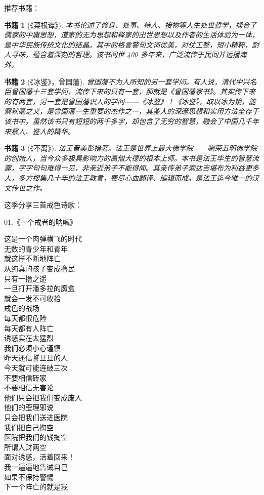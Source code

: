 \documentclass{ctexart}
\newtheorem{book}{书籍}
\begin{document}
推荐书籍：

\begin{book}[《菜根谭》]
    本书论述了修身、处事、待人、接物等人生处世哲学，揉合了儒家的中庸思想，道家的无为思想和释家的出世思想以及作者的生活体验为一体，是中华民族传统文化的结晶。其中的格言警句文词优美，对仗工整，短小精粹，耐人寻味，蕴含着深刻的哲理。该书问世 400 多年来，广泛流传于民间并远播海外。
\end{book}

\begin{book}[《冰鉴》，曾国藩]
    曾国藩不为人所知的另一套学问。有人说，清代中兴名臣曾国藩十三套学问，流传下来的只有一套，那就是《曾国藩家书》。其实传下来的有两套，另一套是曾国藩识人的学问——《冰鉴》！《冰鉴》，取以冰为镜，能察秋毫之义，是曾国藩一生重要的杰作之一，其鉴人的深邃思想和实用方法全存于该书中。虽然该书只有短短的两千多字，却包含了无穷的智慧，融会了中国几千年来察人、鉴人的精华。
\end{book}

\begin{book}[《不离》]
    法王晋美彭措著。法王是世界上最大佛学院——喇荣五明佛学院的创始人，当今众多极具影响力的高僧大德的根本上师。本书是法王毕生的智慧流露，字字句句难得一见，非亲近弟子不能得闻。其亲传弟子索达吉堪布为利益更多人，多方搜集几十年的法王教言，费尽心血翻译、编辑而成。是法王迄今唯一的汉文传世之作。
\end{book}


这季分享三首戒色诗歌：

\begin{center}
    01.《一个戒者的呐喊》\it
    \begin{multicols}{2}
        这是一个肉弹横飞的时代 \\ 无数的青少年和青年 \\ 就这样不断地阵亡 \\ 从纯真的孩子变成撸民 \\ 只有一撸之遥 \\ 一旦打开潘多拉的魔盒 \\ 就会一发不可收拾 \\ 戒色的战场 \\ 每天都很危险 \\ 每天都有人阵亡 \\ 诱惑实在太猛烈 \\ 我们必须小心谨慎 \\ 昨天还信誓旦旦的人 \\ 今天就可能连破三次 \\ 不要相信砖家 \\ 不要相信无害论 \\ 他们只会把我们变成废人 \\ 他们的歪理邪说 \\ 只会把我们送进医院 \\ 我们把自己掏空 \\ 医院把我们的钱掏空 \\ 所谓人财两空 \\ 面对诱惑，活着回来！ \\ 我一遍遍地告诫自己 \\ 如果不保持警惕 \\ 下一个阵亡的就是我
    \end{multicols}
\end{center}
\end{document}

